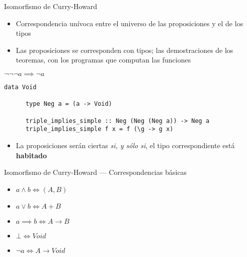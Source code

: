 \documentclass[10pt]{beamer}
\begin{document}
\begin{frame}[fragile]{Isomorfismo de Curry-Howard}

  \begin{itemize}
  \item Correspondencia unívoca entre el universo de las proposiciones
    y el de los tipos
  \item Las proposiciones se corresponden con tipos; las
    demostraciones de los teoremas, con los programas que computan las
    funciones
  \end{itemize}
  \begin{minipage}{0.3\textwidth}
    \begin{center}
      $\neg \neg \neg a \implies \neg a$
    \end{center}
  \end{minipage}
  \begin{minipage}{0.65\textwidth}
    \begin{center}
      \begin{lstlisting}[basicstyle=\tiny]
      data Void

      type Neg a = (a -> Void)

      triple_implies_simple :: Neg (Neg (Neg a)) -> Neg a
      triple_implies_simple f x = f (\g -> g x)
      \end{lstlisting}
    \end{center}
  \end{minipage}
  \begin{itemize}
  \item La proposiciones serán ciertas \textit{si, y sólo si}, el tipo
    correspondiente está \textbf{habitado}
  \end{itemize}

\end{frame}

\begin{frame}[fragile]{Isomorfismo de Curry-Howard --- Correspondencias básicas}

  \begin{itemize}
  \item $a \land b \iff (A, B)$
  \item $a \lor b \iff A + B$
  \item $a \implies b \iff A \rightarrow B$
  \item $\bot \iff Void$
  \item $\neg a \iff A \rightarrow Void$
  \end{itemize}

\end{frame}
\end{document}
